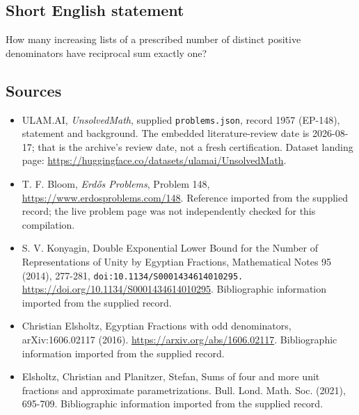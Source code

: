 \documentclass[11pt,a4paper]{article}
\begin{document}
\subsection{Short English statement}

How many increasing lists of a prescribed number of distinct positive denominators have reciprocal sum exactly one?

\subsection{Sources}

{\small

\begin{itemize}

\item[\hypertarget{source:1957:1}{S1}] ULAM.AI, \emph{UnsolvedMath}, supplied \texttt{problems.json}, record 1957 (EP-148), statement and background. The embedded literature-review date is 2026-08-17; that is the archive’s review date, not a fresh certification. Dataset landing page: \url{https://huggingface.co/datasets/ulamai/UnsolvedMath}.

\item[\hypertarget{source:1957:2}{S2}] T. F. Bloom, \emph{Erdős Problems}, Problem 148, \url{https://www.erdosproblems.com/148}. Reference imported from the supplied record; the live problem page was not independently checked for this compilation.

\item[\hypertarget{source:1957:3}{S3}] S. V. Konyagin, Double Exponential Lower Bound for the Number of Representations of Unity by Egyptian Fractions, Mathematical Notes 95 (2014), 277-281, \nolinkurl{doi:10.1134/S0001434614010295.} \url{https://doi.org/10.1134/S0001434614010295}. Bibliographic information imported from the supplied record.

\item[\hypertarget{source:1957:4}{S4}] Christian Elsholtz, Egyptian Fractions with odd denominators, arXiv:1606.02117 (2016). \url{https://arxiv.org/abs/1606.02117}. Bibliographic information imported from the supplied record.

\item[\hypertarget{source:1957:5}{S5}] Elsholtz, Christian and Planitzer, Stefan, Sums of four and more unit fractions and approximate parametrizations. Bull. Lond. Math. Soc. (2021), 695-709. Bibliographic information imported from the supplied record.

\end{itemize}

}

\label{end:1957}
\end{document}
